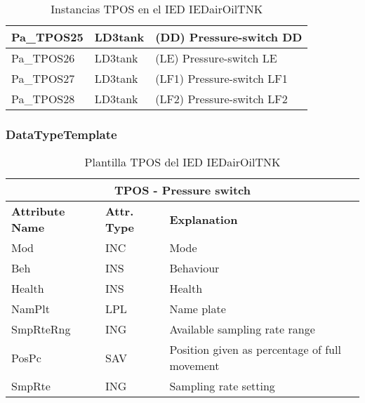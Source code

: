 \begin{table}[H]
\begin{center}
\begin{tabular}{|l|l|p{6.8cm}|}
            \hline
            Pa\_TPOS25 & LD3tank & (DD) Pressure-switch DD \\
            \hline
            Pa\_TPOS26 & LD3tank & (LE) Pressure-switch LE \\
            \hline
            Pa\_TPOS27 & LD3tank & (LF1) Pressure-switch LF1 \\
            \hline
            Pa\_TPOS28 & LD3tank & (LF2) Pressure-switch LF2 \\
            \hline
    \end{tabular}
    \caption{Instancias TPOS en el IED IEDairOilTNK}
    \label{table:lnInstTPOS_prs_sw}
    \end{center}
    \end{table}
    
    
    
    \subsubsection{DataTypeTemplate}
    \begin{table}[H]
    \begin{center}
    \begin{tabular}{|l|l|p{8.5cm}|}
            \hline
            \multicolumn{3}{|c|}{\cellcolor[gray]{0.8} \textbf{ TPOS}  - Pressure switch} \\
            \hline
            \textbf{Attribute Name} & \textbf{Attr. Type} & \textbf{Explanation} \\
            \hline 
            Mod & INC & Mode \\
            \hline
            Beh & INS & Behaviour \\
            \hline
            Health & INS & Health \\
            \hline
            NamPlt & LPL & Name plate \\
            \hline
            SmpRteRng & ING & Available sampling rate range \\
            \hline
            PosPc & SAV & Position given as percentage of full movement \\
            \hline
            SmpRte & ING & Sampling rate setting \\
            \hline
    \end{tabular}
    \caption{Plantilla TPOS del IED IEDairOilTNK}
    \label{table:lnTypeTPOS_prs_sw}
    \end{center}
    \end{table}
    
    
    